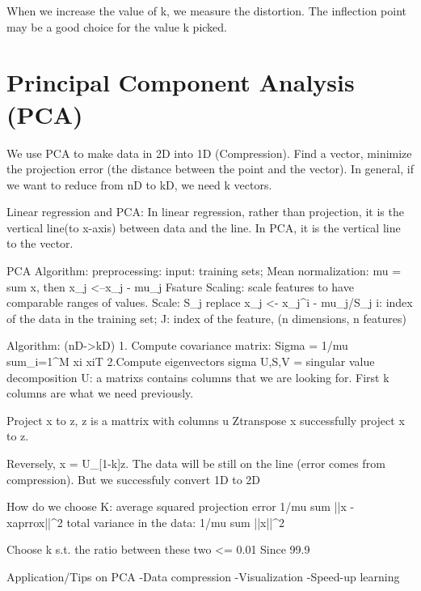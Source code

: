 \documentclass{article}
\begin{document}
When we increase the value of k, we measure the distortion. The inflection point may be a good choice for the value k picked.

\section*{Principal Component Analysis (PCA)}
We use PCA to make data in 2D into 1D (Compression). Find a vector, minimize the projection error (the distance between the point and the vector). In general, if we want to reduce from nD to kD, we need k vectors.

Linear regression and PCA: In linear regression, rather than projection, it is the vertical line(to x-axis) between data and the line. In PCA, it is the vertical line to the vector. 

PCA Algorithm:
preprocessing: input: training sets;
Mean normalization: mu = sum x, then x_j <--x_j - mu_j
Fsature Scaling: scale features to have comparable ranges of values. Scale: S_j
replace x_j <- x_j^i - mu_j/S_j
i: index of the data in the training set; 
J: index of the feature, (n dimensions, n features)

Algorithm: (nD->kD)
1. Compute covariance matrix:
Sigma = 1/mu sum_i=1^M xi xiT
2.Compute eigenvectors sigma
U,S,V = singular value decomposition
U: a matrixs contains columns that we are looking for. First k columns are what we need previously.

Project x to z, z is a mattrix with columns u
Ztranspose x successfully project x to z. 

Reversely, x = U_[1-k]z. The data will be still on the line (error comes from compression). But we successfuly convert 1D to 2D

How do we choose K: average squared projection error 1/mu sum ||x - xaprrox||^2
total variance in the data: 1/mu sum ||x||^2

Choose k s.t. the ratio between these two  <= 0.01
Since 99.9%

Application/Tips on PCA
-Data compression
-Visualization
-Speed-up learning
\end{document}
